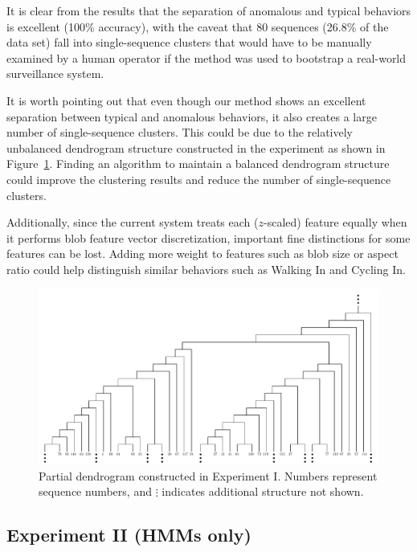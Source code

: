 It is clear from the results that the separation of anomalous and typical
behaviors is excellent (100\% accuracy), with the caveat that 80 sequences
(26.8\% of the data set) fall into single-sequence clusters that would have to
be manually examined by a human operator if the method was used to bootstrap a
real-world surveillance system.

It is worth pointing out that even though our method shows an excellent
separation between typical and anomalous behaviors, it also creates a large
number of single-sequence clusters. This could be due to the relatively
unbalanced dendrogram structure constructed in the experiment as shown in
Figure~\ref{fig:partial-dendrogram}. Finding an algorithm to maintain a
balanced dendrogram structure could improve the clustering results and reduce
the number of single-sequence clusters.
 
Additionally, since the current system treats each ($z$-scaled) feature equally
when it performs blob feature vector discretization, important fine
distinctions for some features can be lost. Adding more weight to features such
as blob size or aspect ratio could help distinguish similar behaviors such as
Walking In and Cycling In. 

\begin{figure}[t]
  \centering
  \includegraphics[width=6.15in]{figures/partial-dendrogram}
  \caption[Partial dendrogram constructed in Experiment I.]
  {\small Partial dendrogram constructed in Experiment I. Numbers represent
  sequence numbers, and $\vdots$ indicates additional structure not shown.}
  \label{fig:partial-dendrogram}
\end{figure}

\subsection{Experiment II (HMMs only)}

